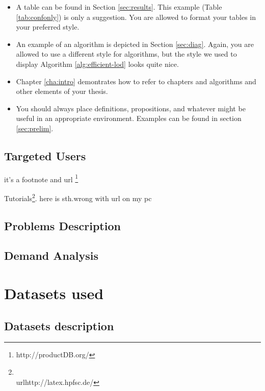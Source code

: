 \documentclass[11pt,titlepage,oneside,openany]{book}
\begin{document}
\begin{itemize}
	\item A table can be found in Section \ref{sec:results}. This example (Table \ref{tab:confonly}) is only a suggestion. You are allowed to format your tables in your preferred style.
	\item An example of an algorithm is depicted in Section \ref{sec:diag}. Again, you are allowed to use a different style for algorithms, but the style we used to display Algorithm \ref{alg:efficient-lod} looks quite nice.
	\item Chapter \ref{cha:intro} demontrates how to refer to chapters and algorithms and other elements of your thesis.
	\item You should always place definitions, propositions, and whatever might be useful in an appropriate environment.  Examples can be found in section \ref{sec:prelim}.
\end{itemize}




 
\section{Targeted Users}
 
it's  a footnote and url
\footnote{http://productDB.org/}


Tutorials\footnote{\\url{http://latex.hpfsc.de/}}.  
 here is sth.wrong with url on my pc


\section{Problems Description}

 

\section{Demand Analysis}



\chapter{Datasets used}
\label{cha:dataset}




\section{Datasets description}
\label{sec:datadesc}
\end{document}
